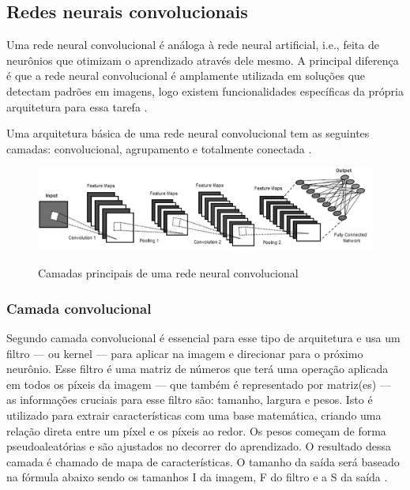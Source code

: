 \subsection{Redes neurais convolucionais}

Uma rede neural convolucional é análoga à rede neural artificial, i.e., feita de neurônios que otimizam o aprendizado através dele mesmo. A principal diferença é que a rede neural convolucional é amplamente utilizada em soluções que detectam padrões em imagens, logo existem funcionalidades específicas da própria arquitetura para essa tarefa \cite{oshea2015introduction}. 

Uma arquitetura básica de uma rede neural convolucional tem as seguintes camadas: convolucional, agrupamento e totalmente conectada \cite{dp_overview}.

\begin{figure}[H]
	\caption{Camadas principais de uma rede neural convolucional}
	\centering %
	\includegraphics[width=15cm]{figures/arquitetura_cnn.png} %
	\label{fig:arquitetura_cnn}
\end{figure}

\subsubsection*{Camada convolucional}

Segundo  camada convolucional é essencial para esse tipo de arquitetura e usa um filtro — ou kernel — para aplicar na imagem e direcionar para o próximo neurônio. Esse filtro é uma matriz de números que terá uma operação aplicada em todos os píxeis da imagem — que também é representado por matriz(es) — as informações cruciais para esse filtro são: tamanho, largura e pesos. Isto é utilizado para extrair características com uma base matemática, criando uma relação direta entre um píxel e os píxeis ao redor. Os pesos começam de forma pseudoaleatórias e são ajustados no decorrer do aprendizado. O resultado dessa camada é chamado de mapa de características. O tamanho da saída será baseado na fórmula abaixo sendo os tamanhos I da imagem, F do filtro e a S da saída \cite{computation11030052}.


